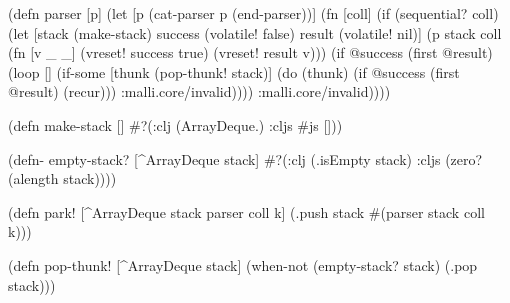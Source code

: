 \documentclass{beamer}
\begin{document}

\begin{frame}[fragile]

{\scriptsize
\begin{semiverbatim}
(defn parser [p]
  (let [p (cat-parser p (end-parser))]
    (fn [coll]
      (if (sequential? coll)
        (let [stack (make-stack)
              success (volatile! false)
              result (volatile! nil)]
          (p stack coll (fn [v _ _]
                          (vreset! success true)
                          (vreset! result v)))
          (if @success
            (first @result)
            (loop []
              (if-some [thunk (pop-thunk! stack)]
                (do
                  (thunk)
                  (if @success
                    (first @result)
                    (recur)))
                :malli.core/invalid))))
        :malli.core/invalid))))
\end{semiverbatim}
}

\end{frame}


\begin{frame}[fragile]

\begin{semiverbatim}
(defn make-stack []
  #?(:clj (ArrayDeque.)
     :cljs #js []))

(defn- empty-stack? [^ArrayDeque stack]
  #?(:clj (.isEmpty stack)
     :cljs (zero? (alength stack))))

(defn park! [^ArrayDeque stack parser coll k]
  (.push stack #(parser stack coll k)))

(defn pop-thunk! [^ArrayDeque stack]
  (when-not (empty-stack? stack) (.pop stack)))
\end{semiverbatim}

\end{frame}
\end{document}
